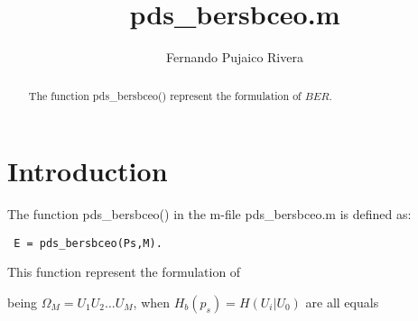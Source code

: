 \documentclass[a4paper,10pt]{article}
\title{pds\_bersbceo.m}
\author{Fernando Pujaico Rivera}
\begin{document}
\maketitle
\begin{abstract}
The function pds\_bersbceo() represent the formulation of $BER$.
\end{abstract}

\section{Introduction}
The function pds\_bersbceo() in the m-file pds\_bersbceo.m is defined as:
\lstset{language=octave}%
\begin{lstlisting}
 E = pds_bersbceo(Ps,M).
\end{lstlisting}
This function represent the formulation of 

being $\Omega_M=U_1 U_2 ... U_M$, when $H_b(p_s) = H(U_i|U_0)$
are all equals
\end{document}

